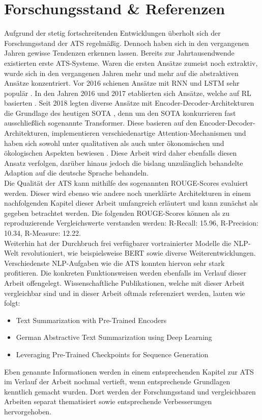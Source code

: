 \section{Forschungsstand \& Referenzen}
\noindent
Aufgrund der stetig fortschreitenden Entwicklungen überholt sich der Forschungsstand der \ac{ATS} regelmäßig. Dennoch haben sich in den vergangenen Jahren gewisse Tendenzen erkennen lassen. Bereits zur Jahrtausendwende existierten erste \ac{ATS}-Systeme. Waren die ersten Ansätze zumeist noch extraktiv, wurde sich in den vergangenen Jahren mehr und mehr auf die abstraktiven Ansätze konzentriert. Vor 2016 schienen Ansätze mit \ac{RNN} und \ac{LSTM} sehr populär \cite{NAL16}. In den Jahren 2016 und 2017 etablierten sich Ansätze, welche auf \ac{RL} basierten \cite{PAU17}. Seit 2018 legten diverse Ansätze mit Encoder-Decoder-Architekturen die Grundlage des heutigen \ac{SOTA} \cite{YAN19, ROT20}, denn um den \ac{SOTA} konkurrieren fast ausschließlich sogenannte Transformer. Diese basieren auf den Encoder-Decoder-Architekturen, implementieren verschiedenartige Attention-Mechanismen und haben sich sowohl unter qualitativen als auch unter ökonomischen und ökologischen Aspekten bewiesen \cite{ZHA20}. Diese Arbeit wird daher ebenfalls diesen Ansatz verfolgen, darüber hinaus jedoch die bislang unzulänglich behandelte Adaption auf die deutsche Sprache behandeln.\\

\noindent
Die Qualität der \ac{ATS} kann mithilfe des sogenannten ROUGE-Scores evaluiert werden. Dieser wird ebenso wie andere noch unerklärte Architekturen in einem nachfolgenden Kapitel dieser Arbeit umfangreich erläutert und kann zunächst als gegeben betrachtet werden. Die folgenden ROUGE-Scores können als zu reproduzierende Vergleichswerte verstanden werden: R-Recall: 15.96, R-Precision: 10.34, R-Measure: 12.22.\\

\noindent
Weiterhin hat der Durchbruch frei verfügbarer vortrainierter Modelle die \ac{NLP}-Welt revolutioniert, wie beispielsweise \ac{BERT} \cite{DEV19} sowie diverse Weiterentwicklungen. Verschiedenste \ac{NLP}-Aufgaben wie die \ac{ATS} konnten hiervon sehr stark profitieren. Die konkreten Funktionsweisen werden ebenfalls im Verlauf dieser Arbeit offengelegt. Wissenschaftliche Publikationen, welche mit dieser Arbeit vergleichbar sind und in dieser Arbeit oftmals referenziert werden, lauten wie folgt:

\begin{itemize}
	\item Text Summarization with Pre-Trained Encoders \cite{YAN19}
	\item German Abstractive Text Summarization using Deep Learning \cite{NIT19}
	\item Leveraging Pre-Trained Checkpoints for Sequence Generation \cite{ROT20}
\end{itemize}

\noindent
Eben genannte Informationen werden in einem entsprechenden Kapitel zur \ac{ATS} im Verlauf der Arbeit nochmal vertieft, wenn entsprechende Grundlagen kenntlich gemacht wurden. Dort werden der Forschungsstand und vergleichbaren Arbeiten separat thematisiert sowie entsprechende Verbesserungen hervorgehoben.
